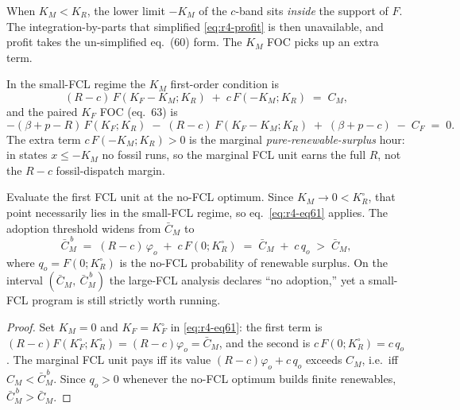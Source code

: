 When $K_M<K_R$, the lower limit $-K_M$ of the $c$-band sits \emph{inside} the support
of $F$. The integration-by-parts that simplified \eqref{eq:r4-profit} is then
unavailable, and profit takes the un-simplified eq.~(60) form. The $K_M$ FOC picks up
an extra term.

\begin{lemma}
\label{lem:r4-eq61}
In the small-FCL regime the $K_M$ first-order condition is
\begin{equation}
\label{eq:r4-eq61}
(R-c)\,F(K_F-K_M;K_R) \;+\; c\,F(-K_M;K_R) \;=\; C_M,
\end{equation}
and the paired $K_F$ FOC (eq.~63) is
\begin{equation}
\label{eq:r4-eq63}
-(\beta+p-R)\,F(K_F;K_R) \;-\; (R-c)\,F(K_F-K_M;K_R) \;+\; (\beta+p-c) \;-\; C_F \;=\; 0.
\end{equation}
The extra term $c\,F(-K_M;K_R)>0$ is the marginal \emph{pure-renewable-surplus} hour:
in states $x\le -K_M$ no fossil runs, so the marginal FCL unit earns the full $R$, not
the $R-c$ fossil-dispatch margin.
\end{lemma}

\begin{proposition}
\label{prop:r4-eq62}
Evaluate the first FCL unit at the no-FCL optimum. Since $K_M\to 0<K_R^\circ$, that
point necessarily lies in the small-FCL regime, so eq.~\eqref{eq:r4-eq61} applies. The
adoption threshold widens from $\bar C_M$ to
\begin{equation}
\label{eq:r4-CMbarb}
\boxed{\;\bar C_M^{\,b} \;=\; (R-c)\,\varphi_o \;+\; c\,F(0;K_R^\circ)
   \;=\; \bar C_M \;+\; c\,q_o \;>\; \bar C_M,\;}
\end{equation}
where $q_o=F(0;K_R^\circ)$ is the no-FCL probability of renewable surplus. On the
interval $(\bar C_M,\ \bar C_M^{\,b})$ the large-FCL analysis declares ``no adoption,''
yet a small-FCL program is still strictly worth running.
\end{proposition}

\begin{proof}
Set $K_M=0$ and $K_F=K_F^\circ$ in \eqref{eq:r4-eq61}: the first term is
$(R-c)F(K_F^\circ;K_R^\circ)=(R-c)\varphi_o=\bar C_M$, and the second is
$c\,F(0;K_R^\circ)=c\,q_o$. The marginal FCL unit pays iff its value
$(R-c)\varphi_o+c\,q_o$ exceeds $C_M$, i.e.\ iff $C_M<\bar C_M^{\,b}$. Since $q_o>0$
whenever the no-FCL optimum builds finite renewables, $\bar C_M^{\,b}>\bar C_M$.
\end{proof}

